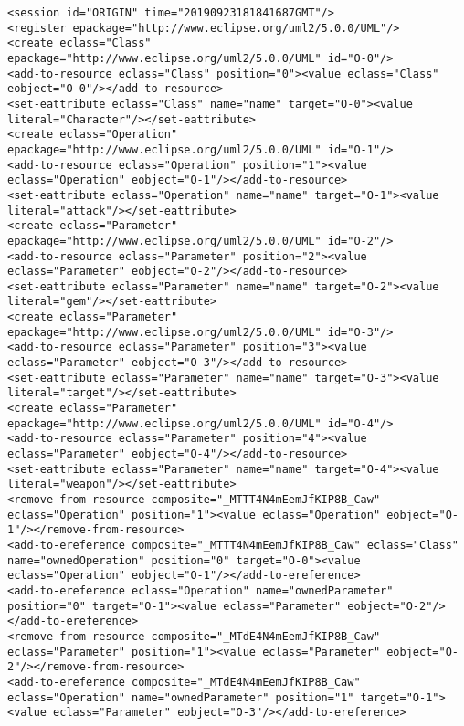\vspace{-20pt}
\begin{lstlisting}[style=cbpfile,caption={Change-based representation of the model in Figure \ref{fig:class_diagram_left}.},label=lst:class_diagram_left_cbpfile]
<session id="ORIGIN" time="20190923181841687GMT"/>
<register epackage="http://www.eclipse.org/uml2/5.0.0/UML"/>
<create eclass="Class" epackage="http://www.eclipse.org/uml2/5.0.0/UML" id="O-0"/>
<add-to-resource eclass="Class" position="0"><value eclass="Class" eobject="O-0"/></add-to-resource>
<set-eattribute eclass="Class" name="name" target="O-0"><value literal="Character"/></set-eattribute>
<create eclass="Operation" epackage="http://www.eclipse.org/uml2/5.0.0/UML" id="O-1"/>
<add-to-resource eclass="Operation" position="1"><value eclass="Operation" eobject="O-1"/></add-to-resource>
<set-eattribute eclass="Operation" name="name" target="O-1"><value literal="attack"/></set-eattribute>
<create eclass="Parameter" epackage="http://www.eclipse.org/uml2/5.0.0/UML" id="O-2"/>
<add-to-resource eclass="Parameter" position="2"><value eclass="Parameter" eobject="O-2"/></add-to-resource>
<set-eattribute eclass="Parameter" name="name" target="O-2"><value literal="gem"/></set-eattribute>
<create eclass="Parameter" epackage="http://www.eclipse.org/uml2/5.0.0/UML" id="O-3"/>
<add-to-resource eclass="Parameter" position="3"><value eclass="Parameter" eobject="O-3"/></add-to-resource>
<set-eattribute eclass="Parameter" name="name" target="O-3"><value literal="target"/></set-eattribute>
<create eclass="Parameter" epackage="http://www.eclipse.org/uml2/5.0.0/UML" id="O-4"/>
<add-to-resource eclass="Parameter" position="4"><value eclass="Parameter" eobject="O-4"/></add-to-resource>
<set-eattribute eclass="Parameter" name="name" target="O-4"><value literal="weapon"/></set-eattribute>
<remove-from-resource composite="_MTTT4N4mEemJfKIP8B_Caw" eclass="Operation" position="1"><value eclass="Operation" eobject="O-1"/></remove-from-resource>
<add-to-ereference composite="_MTTT4N4mEemJfKIP8B_Caw" eclass="Class" name="ownedOperation" position="0" target="O-0"><value eclass="Operation" eobject="O-1"/></add-to-ereference>
<add-to-ereference eclass="Operation" name="ownedParameter" position="0" target="O-1"><value eclass="Parameter" eobject="O-2"/></add-to-ereference>
<remove-from-resource composite="_MTdE4N4mEemJfKIP8B_Caw" eclass="Parameter" position="1"><value eclass="Parameter" eobject="O-2"/></remove-from-resource>
<add-to-ereference composite="_MTdE4N4mEemJfKIP8B_Caw" eclass="Operation" name="ownedParameter" position="1" target="O-1"><value eclass="Parameter" eobject="O-3"/></add-to-ereference>

\end{lstlisting}
